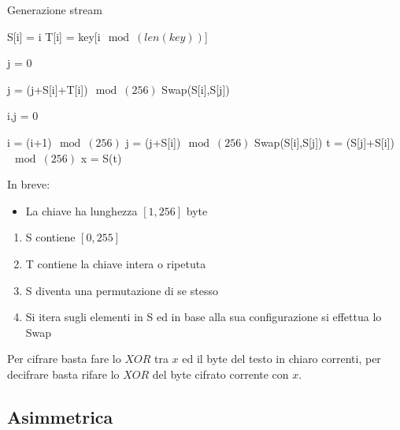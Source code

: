 \documentclass{article}
\begin{document}
\begin{algorithm}[ht]
\caption{Generazione stream }
\begin{algorithmic}

 

    \State S[i] = i
    \State T[i] = key[i$\mod(len(key))$]

\EndFor

\State

\State j = 0 


    \State j = (j+S[i]+T[i])$\mod(256)$
    \State Swap(S[i],S[j])

\EndFor

\State

\State i,j = 0 


    \State i = (i+1)$\mod(256)$
    \State j = (j+S[i])$\mod(256)$
    \State Swap(S[i],S[j])
    \State t = (S[j]+S[i])$\mod(256)$
    \State x = S(t)

\EndWhile

\end{algorithmic}
\end{algorithm}

\newpage

\noindent In breve:
\begin{itemize}
    \item La chiave ha lunghezza $[1,256]$ byte
\end{itemize}
\begin{enumerate}
    \item S contiene $[0,255]$
    \item T contiene la chiave intera o ripetuta
    \item S diventa una permutazione di se stesso
    \item Si itera sugli elementi in S ed in base alla sua configurazione si effettua lo Swap\newline
    
\end{enumerate}

\noindent Per cifrare basta fare lo $XOR$ tra $x$ ed il byte del testo in chiaro correnti, per decifrare basta rifare lo $XOR$ del byte cifrato corrente con $x$.

\subsection{Asimmetrica}
\end{document}

